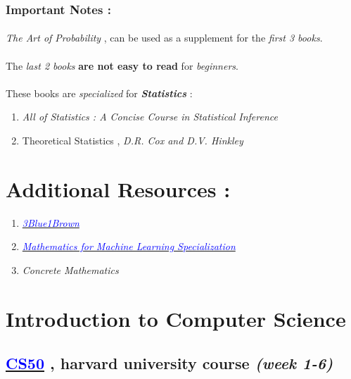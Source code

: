 \documentclass[12pt, a4paper]{article}
\begin{document}
\subsubsection*{Important Notes :}
\paragraph{}
\emph{The Art of Probability} ,  can be used as a supplement for the \emph{first 3 books}.

\paragraph{}
The \emph{last 2 books} \textbf{are not easy to read} for \emph{\large{beginners}}.

\paragraph{}
These books are \emph{\large{specialized}} for \textbf{\emph{Statistics}} :
\begin{enumerate}
	\item \emph{All of Statistics : A Concise Course in Statistical Inference}
	\item Theoretical Statistics , \emph{\large{D.R. Cox and D.V. Hinkley}} 
\end{enumerate}

\section*{Additional Resources :}
\begin{enumerate}
	\item \href{https://www.3blue1brown.com}{\emph{\textcolor{blue}{\large{3Blue1Brown}}}}
	\item \href{https://www.coursera.org/specializations/mathematics-machine-learning}{\emph{\textcolor{blue}{Mathematics for Machine Learning Specialization}}}
	\item \emph{\large{Concrete Mathematics}}
\end{enumerate}

\newpage
\section{Introduction to Computer Science}
\subsection*{\href{https://cs50.harvard.edu/college/2021/spring/}{\textcolor{blue}{CS50}} , harvard university course \emph{(week 1-6)}}
\end{document}
